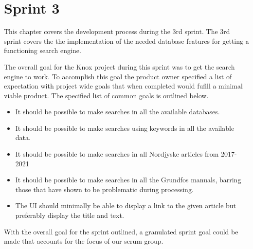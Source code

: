 \chapter{Sprint 3}
This chapter covers the development process during the 3rd sprint. The 3rd sprint covers the the implementation of the needed database features for getting a functioning search engine. 


The overall goal for the Knox project during this sprint was to get the search engine to work. To accomplish this goal the product owner specified a list of expectation with project wide goals that when completed would fufill a minimal viable product. The specified list of common goals is outlined below.
\begin{itemize}
	\item It should be possible to make searches in all the available databases.
	\item It should be possible to make searches using keywords in all the available data.
	\item It should be possible to make searches in all Nordjyske articles from 2017-2021
	\item It should be possible to make searches in all the Grundfos manuals, barring those that have shown to be problematic during processing.
	\item The UI should minimally be able to display a link to the given article but preferably display the title and text.
\end{itemize}

With the overall goal for the sprint outlined, a granulated sprint goal could be made that accounts for the focus of our scrum group.






